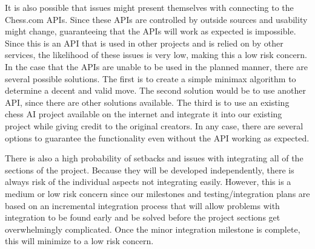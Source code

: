 \documentclass[11pt,journal]{IEEEtran}
\begin{document}
It is also possible that issues might present themselves with connecting to the Chess.com APIs. Since these APIs are controlled by outside sources and usability might change, guaranteeing that the APIs will work as expected is impossible. Since this is an API that is used in other projects and is relied on by other services, the likelihood of these issues is very low, making this a low risk concern. In the case that the APIs are unable to be used in the planned manner, there are several possible solutions. The first is to create a simple minimax algorithm to determine a decent and valid move. The second solution would be to use another API, since there are other solutions available. The third is to use an existing chess AI project available on the internet and integrate it into our existing project while giving credit to the original creators. In any case, there are several options to guarantee the functionality even without the API working as expected.

There is also a high probability of setbacks and issues with integrating all of the sections of the project. Because they will be developed independently, there is always risk of the individual aspects not integrating easily. However, this is a medium or low risk concern since our milestones and testing/integration plans are based on an incremental integration process that will allow problems with integration to be found early and be solved before the project sections get overwhelmingly complicated. Once the minor integration milestone is complete, this will minimize to a low risk concern.
\end{document}
